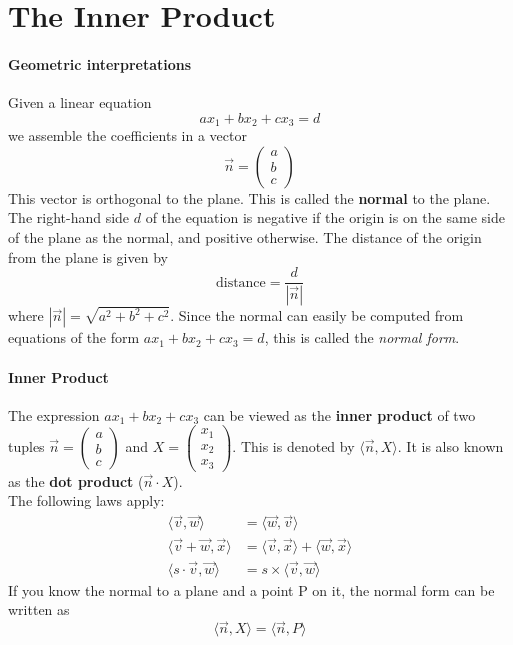 \documentclass{article}
\begin{document}
\section{The Inner Product}
\paragraph{Geometric interpretations}
Given a linear equation
$$ax_1+bx_2+cx_3=d$$
we assemble the coefficients in a vector
$$\vec{n}=\begin{pmatrix}a\\b\\c\end{pmatrix}$$
This vector is orthogonal to the plane. This is called the \textbf{normal} to the plane.
\vspace{1mm}\\
The right-hand side $d$ of the equation is negative if the origin is on the same side of the plane as the normal, and positive otherwise. The distance of the origin from the plane is given by
$$\text{distance}=\frac{d}{|\vec{n}|}$$
where $|\vec{n}|=\sqrt{a^2+b^2+c^2}$.
Since the normal can easily be computed from equations of the form $ax_1+bx_2+cx_3=d$, this is called the \textit{normal form}.

\paragraph{Inner Product}
The expression $ax_1+bx_2+cx_3$ can be viewed as the \textbf{inner product} of two tuples $\vec{n}=\begin{pmatrix}a\\b\\c\end{pmatrix}$ and $X=\begin{pmatrix}x_1\\x_2\\x_3\end{pmatrix}$. This is denoted by $\langle\vec{n},X\rangle$. It is also known as the \textbf{dot product} ($\vec{n}\cdot X$).
\vspace{1mm}\\
The following laws apply:
\begin{align*}
  \langle\vec{v},\vec{w}\rangle&=\langle\vec{w},\vec{v}\rangle\\
  \langle\vec{v}+\vec{w},\vec{x}\rangle&=\langle\vec{v},\vec{x}\rangle+\langle\vec{w},\vec{x}\rangle\\
  \langle s\cdot\vec{v},\vec{w}\rangle&=s\times \langle\vec{v},\vec{w}\rangle
\end{align*}
If you know the normal to a plane and a point P on it, the normal form can be written as
$$\langle\vec{n},X\rangle=\langle\vec{n},P\rangle$$
\end{document}
